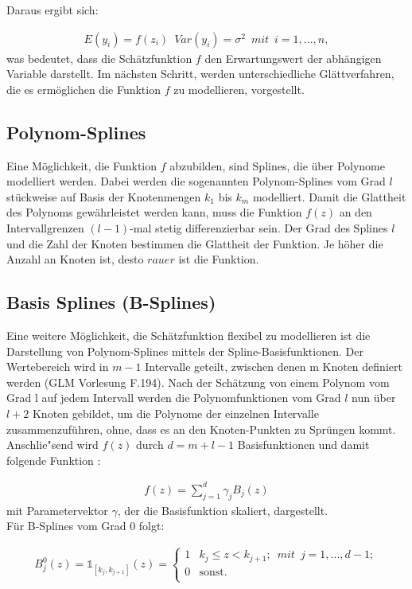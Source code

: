 \documentclass[12pt]{scrreprt}
\begin{document}
	Daraus ergibt sich:
	
	\begin{align}
	E(y_{i})=f(z_{i}) \enspace Var(y_{i})=\sigma^2 \enspace mit \enspace i=1,...,n,
	\end{align}
	was bedeutet, dass die Schätzfunktion $f$ den Erwartungswert der abhängigen Variable darstellt. Im nächsten Schritt, werden unterschiedliche Glättverfahren, die es ermöglichen die Funktion $f$ zu modellieren, vorgestellt.
	
	\subsection{Polynom-Splines}
	Eine Möglichkeit, die Funktion $f$ abzubilden, sind Splines, die über Polynome modelliert werden. Dabei werden die sogenannten Polynom-Splines vom Grad $l$ stückweise auf Basis der Knotenmengen $k_{1}$ bis $k_{m}$ modelliert. Damit die Glattheit des Polynoms gewährleistet werden kann, muss die Funktion $f(z)$ an den Intervallgrenzen $(l-1)$-mal stetig differenzierbar sein. Der Grad des Splines $l$ und die Zahl der Knoten bestimmen die Glattheit der Funktion. Je höher die Anzahl an Knoten ist, desto $rauer$ ist die Funktion.
	
	\subsection{Basis Splines (B-Splines)}
	Eine weitere Möglichkeit, die Schätzfunktion flexibel zu modellieren ist die Darstellung von Polynom-Splines mittels der Spline-Basisfunktionen. Der Wertebereich wird in $m-1$ Intervalle geteilt, zwischen denen m Knoten definiert werden (GLM Vorlesung F.194). Nach der Schätzung von einem Polynom vom Grad l auf jedem Intervall werden die Polynomfunktionen vom Grad $l$ nun über $l + 2$ Knoten gebildet, um die Polynome der einzelnen Intervalle zusammenzuführen, ohne, dass es an den Knoten-Punkten zu Sprüngen kommt. Anschlie"send wird $f(z)$ durch $d = m+l-1$ Basisfunktionen und damit folgende Funktion :
	
	\begin{align}
	f(z)=\sum_{j=1}^d\gamma_{j}B_{j}(z)
	\end{align}
	mit Parametervektor $\gamma$, der die Basisfunktion skaliert, dargestellt. \\
	Für B-Splines vom Grad 0 folgt:
	
	\begin{align}
	B_{j}^0(z)= \mathbb{1}_{[k_{j},k_{j+1}]}(z)= 
	\begin{cases}
	1 & k_{j} \leq z<k_{j+1};\enspace mit\enspace j=1,...,d-1; \\
	0 & \text{sonst.} \\
	\end{cases}
	\end{align}
	
\end{document}
